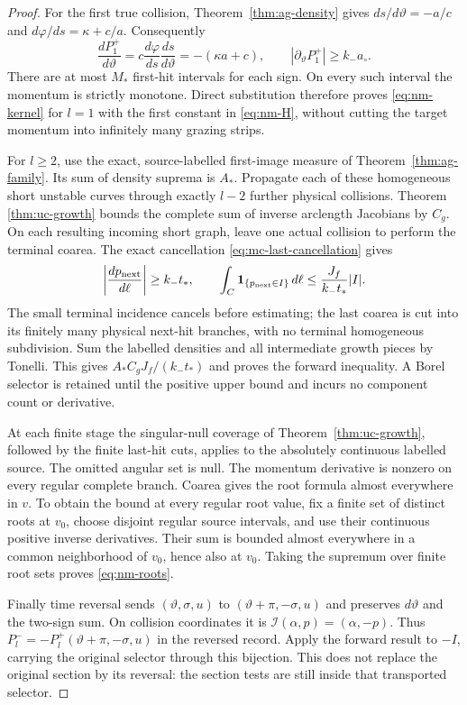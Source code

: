 \begin{proof}
For the first true collision, Theorem~\ref{thm:ag-density} gives
$ds/d\vartheta=-a/c$ and $d\varphi/ds=\kappa+c/a$.
Consequently
\[
 \frac{dP_1^+}{d\vartheta}
       =c\frac{d\varphi}{ds}\frac{ds}{d\vartheta}
       =-(\kappa a+c),\qquad
 |\partial_\vartheta P_1^+|\ge k_-a_\circ.
\]
There are at most $M_*$ first-hit intervals for each sign.  On every
such interval the momentum is strictly monotone.  Direct substitution
therefore proves \eqref{eq:nm-kernel} for $l=1$ with the first
constant in \eqref{eq:nm-H}, without cutting the target momentum
into infinitely many grazing strips.

For $l\ge2$, use the exact, source-labelled first-image measure
of Theorem~\ref{thm:ag-family}.  Its sum of density suprema is
$A_*$.  Propagate each of these homogeneous short unstable curves
through exactly $l-2$ further physical collisions.  Theorem~
\ref{thm:uc-growth} bounds the complete sum of inverse arclength
Jacobians by $C_g$.  On each resulting incoming short graph, leave
one actual collision to perform the terminal coarea.  The exact
cancellation \eqref{eq:mc-last-cancellation} gives
\[
 \left|\frac{dp_{\rm next}}{d\ell}\right|\ge k_-t_*,
 \qquad
 \int_C\mathbf1_{\{p_{\rm next}\in I\}}\,d\ell
                   \le\frac{J_f}{k_-t_*}|I|.
\]
The small terminal incidence cancels before estimating; the last
coarea is cut into its finitely many physical next-hit branches,
with no terminal homogeneous subdivision.  Sum the labelled
densities and all intermediate growth pieces by Tonelli.  This gives
$A_*C_gJ_f/(k_-t_*)$ and proves the forward inequality.  A Borel
selector is retained until the positive upper bound and incurs no
component count or derivative.

At each finite stage the singular-null coverage of
Theorem~\ref{thm:uc-growth}, followed by the finite last-hit cuts,
applies to the absolutely continuous labelled source.  The omitted
angular set is null.  The momentum derivative is nonzero on every
regular complete branch.  Coarea gives the root formula almost
everywhere in $v$.  To obtain the bound at every regular root value,
fix a finite set of distinct roots at $v_0$, choose disjoint regular
source intervals, and use their continuous positive inverse
derivatives.  Their sum is bounded almost everywhere in a common
neighborhood of $v_0$, hence also at $v_0$.  Taking the supremum
over finite root sets proves \eqref{eq:nm-roots}.

Finally time reversal sends
$(\vartheta,\sigma,u)$ to $(\vartheta+\pi,-\sigma,u)$ and
preserves $d\vartheta$ and the two-sign sum.  On collision
coordinates it is $\mathcal I(\alpha,p)=(\alpha,-p)$.
Thus $P_l^-=-P_l^+(\vartheta+\pi,-\sigma,u)$ in the reversed
record.  Apply the forward result to $-I$, carrying the original
selector through this bijection.  This does not replace the
original section by its reversal: the section tests are still
inside that transported selector.
\end{proof}

